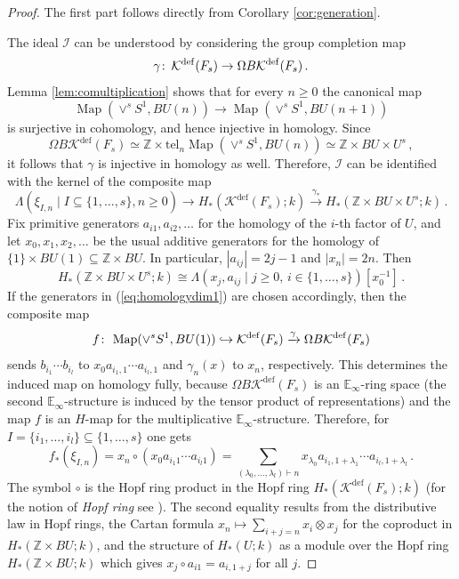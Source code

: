 \documentclass[oneside, a4paper, 12pt]{article}
\numberwithin{equation}{section}
\newcommand{\Kdef}{\mathcal{K}^{\mathrm{def}}}
\newcommand{\Z}{\mathbb{Z}}
\newcommand{\Map}{\operatorname{Map}}
\newcommand{\co}{\colon\thinspace}
\theoremstyle{plain}
\theoremstyle{definition}
\theoremstyle{remark}
\begin{document}
\begin{proof}


The first part follows directly from Corollary \ref{cor:generation}.

The ideal $\mathscr{I}$ can be understood by considering the group completion map
\[
\gamma\co \Kdef(F_s)\to \Omega B \Kdef(F_s)\, .
\]
Lemma \ref{lem:comultiplication} shows that for every $n\geq 0$ the canonical map
\[
\Map(\vee^s S^1,BU(n))\to \Map(\vee^s S^1,BU(n+1))
\]
is surjective in cohomology, and hence injective in homology. Since
\[
\Omega B \Kdef(F_s) \simeq \Z\times \mathrm{tel}_n \Map(\vee^s S^1,BU(n)) \simeq \Z\times BU \times U^s\,,
\]
it follows that $\gamma$ is injective in homology as well. Therefore, $\mathscr{I}$ can be identified with the kernel of the composite map
\[
\Lambda(\xi_{I,n} \mid I\subseteq \{1,\dots,s\},n\geq 0) \to  H_\ast(\Kdef(F_s);k) \xrightarrow{\gamma_\ast} H_\ast(\Z \times BU \times U^s;k)\, .
\]
Fix primitive generators $a_{i1},a_{i2},\dots$ for the homology of the $i$-th factor of $U$, and let $x_0,x_1,x_2,\dots$ be the usual additive generators for the homology of $\{1\}\times BU(1)\subseteq \Z\times BU$. In particular, $|a_{ij}|=2j-1$ and $|x_n|=2n$. Then
\[
H_\ast(\Z \times BU \times U^s;k)\cong \Lambda(x_j,a_{ij} \mid j\geq 0,\, i\in \{1,\dots,s\})[x_0^{-1}]\,.
\]
If the generators in (\ref{eq:homologydim1}) are chosen accordingly, then the composite map
\begin{equation} \label{eq:idealmap}
f\co \Map(\vee^s S^1,BU(1))\hookrightarrow \Kdef(F_s)\xrightarrow{\gamma} \Omega B \Kdef(F_s)
\end{equation}
sends $b_{i_1}\cdots b_{i_l}$ to $x_0 a_{i_1,1}\cdots a_{i_l,1}$ and $\gamma_n(x)$ to $x_n$, respectively. This determines the induced map on homology fully, because $\Omega B \Kdef(F_s)$ is an $\mathbb{E}_\infty$-ring space (the second $\mathbb{E}_\infty$-structure is induced by the tensor product of representations) and the map $f$ is an $H$-map for the multiplicative $\mathbb{E}_\infty$-structure. Therefore, for $I=\{i_1,\dots,i_l\}\subseteq \{1,\dots,s\}$ one gets
\[
f_\ast(\xi_{I,n})=x_n\circ (x_0 a_{i_1 1}\cdots a_{i_l 1}) = \sum_{(\lambda_0,\dots,\lambda_l)\vdash n} x_{\lambda_0} a_{i_1,1+\lambda_1} \cdots a_{i_l,1+\lambda_l}\, .
\]
The symbol $\circ$ is the Hopf ring product in the Hopf ring $H_\ast(\Kdef(F_s);k)$ (for the notion of \emph{Hopf ring} see \cite{Wilson}). The second equality results from the distributive law in Hopf rings, the Cartan formula $x_n\mapsto \sum_{i+j=n} x_i\otimes x_j$ for the coproduct in $H_\ast(\Z\times BU;k)$, and the structure of $H_\ast(U;k)$ as a module over the Hopf ring $H_\ast(\Z\times BU;k)$ which gives $x_j\circ a_{i1}=a_{i,1+j}$ for all $j$.
\end{proof}
\end{document}
